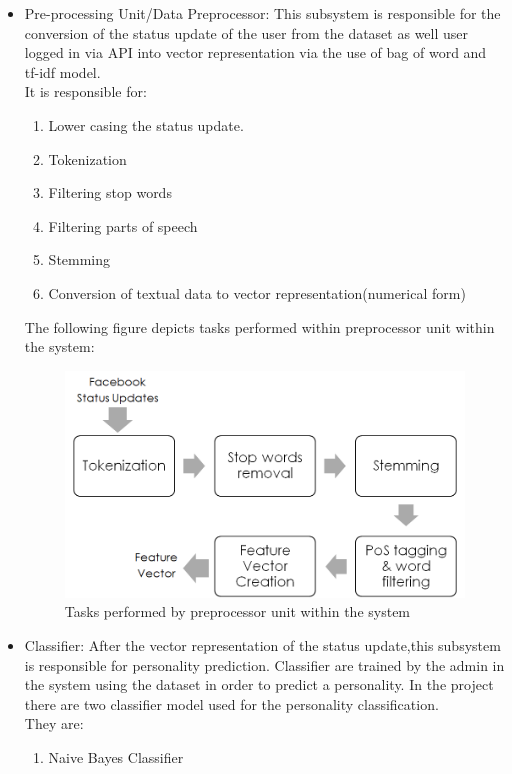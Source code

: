 \begin{itemize}
	\item Pre-processing Unit/Data Preprocessor: This subsystem is responsible for the conversion of the status update of the user from the dataset \cite{dataset} as well user logged in via API \cite{api} into vector representation via the use of bag of word and tf-idf model.\\
It is responsible for:
		\begin{enumerate}
			\item Lower casing the status update.
			\item Tokenization
			\item Filtering stop words
			\item Filtering parts of speech
			\item Stemming
			\item Conversion of textual data to vector representation(numerical form)
		\end{enumerate}
The following figure depicts tasks performed within preprocessor unit within the system:
\begin{figure}[!ht]
\centering
\includegraphics[width = 16 cm]{fig/preprocessing.png}
\caption{Tasks performed by preprocessor unit within the system}
\label{fig:project}
\end{figure}
	\item Classifier: After the vector representation of the status update,this subsystem is responsible for personality prediction. Classifier are trained by the admin in the system using the dataset \cite{dataset} in order to predict a personality. In the project there are two classifier model used for the personality classification.\\
They are:
\begin{enumerate}
	\item Naive Bayes Classifier

\end{enumerate}
\end{itemize}

